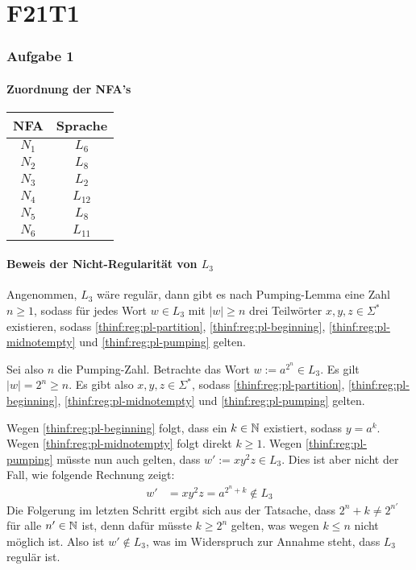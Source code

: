 \section{F21T1}

\subsubsection{Aufgabe 1}

\paragraph{Zuordnung der NFA's}
\begin{tabular}{|c|c|}
	\hline
	NFA & Sprache \\
	\hline
	$N_1$ & $L_6$ \\
	\hline
	$N_2$ & $L_8$ \\
	\hline
	$N_3$ & $L_2$ \\
	\hline
	$N_4$ & $L_12$ \\
	\hline
	$N_5$ & $L_8$ \\
	\hline
	$N_6$ & $L_11$ \\
	\hline
\end{tabular}
\par

\paragraph{Beweis der Nicht-Regularität von $L_3$}
Angenommen, $L_3$ wäre regulär, dann gibt es nach Pumping-Lemma eine Zahl $n
\geq 1$, sodass für jedes Wort $w \in L_3$ mit $|w| \geq n$ drei Teilwörter
$x,y,z \in \Sigma^*$ existieren, sodass \eqref{thinf:reg:pl-partition},
\eqref{thinf:reg:pl-beginning}, \eqref{thinf:reg:pl-midnotempty} und
\eqref{thinf:reg:pl-pumping} gelten.

Sei also $n$ die Pumping-Zahl. Betrachte das Wort $w := a^{2^n} \in L_3$. Es
gilt $|w| = 2^n \geq n$. Es gibt also $x,y,z \in \Sigma^*$, sodass
\eqref{thinf:reg:pl-partition}, \eqref{thinf:reg:pl-beginning},
\eqref{thinf:reg:pl-midnotempty} und \eqref{thinf:reg:pl-pumping} gelten.

Wegen \eqref{thinf:reg:pl-beginning} folgt, dass ein $k \in \mathbb{N}$ existiert,
sodass $y = a^k$. Wegen \eqref{thinf:reg:pl-midnotempty} folgt direkt $k \geq
1$. Wegen \eqref{thinf:reg:pl-pumping} müsste nun auch gelten, dass $w' := xy^2z
\in L_3$. Dies ist aber nicht der Fall, wie folgende Rechnung zeigt:
\begin{align*}
	w'
	& = xy^2z
	= a^{2^n + k} \notin L_3
\end{align*}
Die Folgerung im letzten Schritt ergibt sich aus der Tatsache, dass $2^n + k
\neq 2^{n'}$ für alle $n' \in \mathbb{N}$ ist, denn dafür müsste $k \geq 2^n$ gelten,
was wegen $k \leq n$ nicht möglich ist. Also ist $w' \notin L_3$, was im
Widerspruch zur Annahme steht, dass $L_3$ regulär ist.
\par

